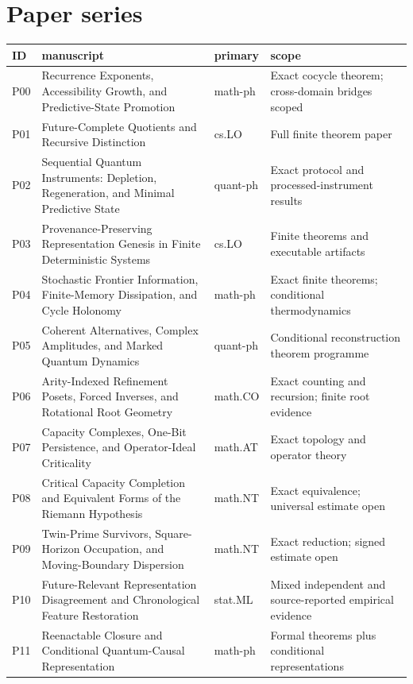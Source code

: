 \documentclass[11pt,a4paper]{article}
\begin{document}
\section{Paper series}
\begin{longtable}{|p{.055\linewidth}|p{.46\linewidth}|p{.12\linewidth}|p{.25\linewidth}|}
\hline
ID & manuscript & primary & scope\\\hline
P00 & Recurrence Exponents, Accessibility Growth, and Predictive-State Promotion & math-ph & Exact cocycle theorem; cross-domain bridges scoped \\ \hline
P01 & Future-Complete Quotients and Recursive Distinction & cs.LO & Full finite theorem paper \\ \hline
P02 & Sequential Quantum Instruments: Depletion, Regeneration, and Minimal Predictive State & quant-ph & Exact protocol and processed-instrument results \\ \hline
P03 & Provenance-Preserving Representation Genesis in Finite Deterministic Systems & cs.LO & Finite theorems and executable artifacts \\ \hline
P04 & Stochastic Frontier Information, Finite-Memory Dissipation, and Cycle Holonomy & math-ph & Exact finite theorems; conditional thermodynamics \\ \hline
P05 & Coherent Alternatives, Complex Amplitudes, and Marked Quantum Dynamics & quant-ph & Conditional reconstruction theorem programme \\ \hline
P06 & Arity-Indexed Refinement Posets, Forced Inverses, and Rotational Root Geometry & math.CO & Exact counting and recursion; finite root evidence \\ \hline
P07 & Capacity Complexes, One-Bit Persistence, and Operator-Ideal Criticality & math.AT & Exact topology and operator theory \\ \hline
P08 & Critical Capacity Completion and Equivalent Forms of the Riemann Hypothesis & math.NT & Exact equivalence; universal estimate open \\ \hline
P09 & Twin-Prime Survivors, Square-Horizon Occupation, and Moving-Boundary Dispersion & math.NT & Exact reduction; signed estimate open \\ \hline
P10 & Future-Relevant Representation Disagreement and Chronological Feature Restoration & stat.ML & Mixed independent and source-reported empirical evidence \\ \hline
P11 & Reenactable Closure and Conditional Quantum-Causal Representation & math-ph & Formal theorems plus conditional representations \\ \hline

\end{longtable}
\end{document}
